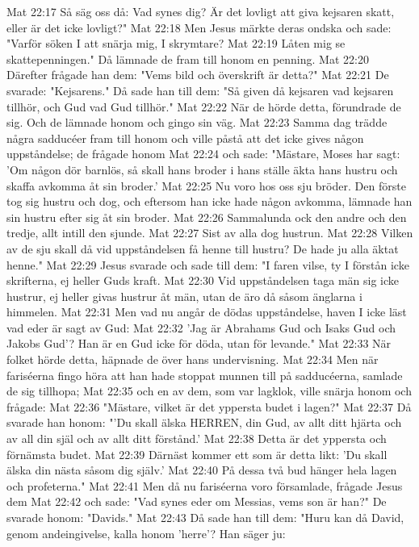 Mat 22:17  Så säg oss då: Vad synes dig? Är det lovligt att giva kejsaren skatt, eller är det icke lovligt?"
Mat 22:18  Men Jesus märkte deras ondska och sade: "Varför söken I att snärja mig, I skrymtare?
Mat 22:19  Låten mig se skattepenningen." Då lämnade de fram till honom en penning.
Mat 22:20  Därefter frågade han dem: "Vems bild och överskrift är detta?"
Mat 22:21  De svarade: "Kejsarens." Då sade han till dem: "Så given då kejsaren vad kejsaren tillhör, och Gud vad Gud tillhör."
Mat 22:22  När de hörde detta, förundrade de sig. Och de lämnade honom och gingo sin väg.
Mat 22:23  Samma dag trädde några sadducéer fram till honom och ville påstå att det icke gives någon uppståndelse; de frågade honom
Mat 22:24  och sade: "Mästare, Moses har sagt: 'Om någon dör barnlös, så skall hans broder i hans ställe äkta hans hustru och skaffa avkomma åt sin broder.'
Mat 22:25  Nu voro hos oss sju bröder. Den förste tog sig hustru och dog, och eftersom han icke hade någon avkomma, lämnade han sin hustru efter sig åt sin broder.
Mat 22:26  Sammalunda ock den andre och den tredje, allt intill den sjunde.
Mat 22:27  Sist av alla dog hustrun.
Mat 22:28  Vilken av de sju skall då vid uppståndelsen få henne till hustru? De hade ju alla äktat henne."
Mat 22:29  Jesus svarade och sade till dem: "I faren vilse, ty I förstån icke skrifterna, ej heller Guds kraft.
Mat 22:30  Vid uppståndelsen taga män sig icke hustrur, ej heller givas hustrur åt män, utan de äro då såsom änglarna i himmelen.
Mat 22:31  Men vad nu angår de dödas uppståndelse, haven I icke läst vad eder är sagt av Gud:
Mat 22:32  'Jag är Abrahams Gud och Isaks Gud och Jakobs Gud'? Han är en Gud icke för döda, utan för levande."
Mat 22:33  När folket hörde detta, häpnade de över hans undervisning.
Mat 22:34  Men när fariséerna fingo höra att han hade stoppat munnen till på sadducéerna, samlade de sig tillhopa;
Mat 22:35  och en av dem, som var lagklok, ville snärja honom och frågade:
Mat 22:36  "Mästare, vilket är det yppersta budet i lagen?"
Mat 22:37  Då svarade han honom: "'Du skall älska HERREN, din Gud, av allt ditt hjärta och av all din själ och av allt ditt förstånd.'
Mat 22:38  Detta är det yppersta och förnämsta budet.
Mat 22:39  Därnäst kommer ett som är detta likt: 'Du skall älska din nästa såsom dig själv.'
Mat 22:40  På dessa två bud hänger hela lagen och profeterna."
Mat 22:41  Men då nu fariséerna voro församlade, frågade Jesus dem
Mat 22:42  och sade: "Vad synes eder om Messias, vems son är han?" De svarade honom: "Davids."
Mat 22:43  Då sade han till dem: "Huru kan då David, genom andeingivelse, kalla honom 'herre'? Han säger ju:
